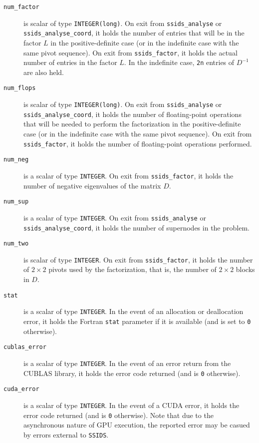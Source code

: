 \documentclass{spral}
\begin{document}
\begin{description}
\item[\texttt{num\_factor}] is scalar of type {\tt INTEGER(long)}. On exit from
{\tt ssids\_analyse}  or {\tt ssids\_analyse\_coord}, it holds the number of entries that will be in the
factor $L$ in the positive-definite case (or in the indefinite case with
the same pivot sequence). On exit from
{\tt ssids\_factor},
it holds the actual number of entries in the factor
$L$. In the indefinite case, {\tt 2n} entries of ${D}^{-1}$ are
also held.

\item[\texttt{num\_flops}] is scalar of type {\tt INTEGER(long)}. On exit from
{\tt ssids\_analyse}  or {\tt ssids\_analyse\_coord}, it holds the number of
floating-point operations that
will be needed to perform the factorization
in the positive-definite case (or in the indefinite case  with
the same pivot sequence).  On exit from {\tt ssids\_factor}, it holds the
number of floating-point operations performed.

\item[\texttt{num\_neg}] is a scalar  of type  {\tt INTEGER}.
On exit from {\tt ssids\_factor}, it holds
the number of negative eigenvalues of the matrix $D$.


\item[\texttt{num\_sup}] is a scalar of type  {\tt INTEGER}.
On exit from {\tt ssids\_analyse}  or {\tt ssids\_analyse\_coord}, it holds
the number of supernodes in the problem.

\item[\texttt{num\_two}] is scalar of type  {\tt INTEGER}.
On exit from
{\tt ssids\_factor}, it holds the number
of $2 \times 2$ pivots used by the factorization, that is,
the number of $2 \times 2$ blocks in $D$.

\item[\texttt{stat}] is a scalar of type  {\tt INTEGER}.
In the event of an allocation or deallocation error, it
holds the Fortran {\tt stat} parameter if it is available
(and is set to {\tt 0} otherwise).

\item[\texttt{cublas\_error}] is a scalar of type {\tt INTEGER}.
In the event of an error return from the CUBLAS library, it
holds the error code returned (and is {\tt 0} otherwise).

\item[\texttt{cuda\_error}] is a scalar of type {\tt INTEGER}.
In the event of a CUDA error, it holds the error code returned (and is {\tt 0}
otherwise). Note that due to the asynchronous nature of GPU execution, the
reported error may be casued by errors external to {\tt SSIDS}.

\end{description}
\end{document}
